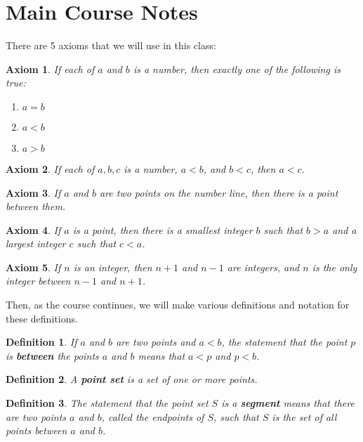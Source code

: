 \documentclass{article}
\newtheorem{axiom}{Axiom}
\newtheorem{definition}{Definition}
\begin{document}
\section*{Main Course Notes}
There are 5 axioms that we will use in this class:

\begin{axiom}
If each of $a$ and $b$ is a number, then exactly one of the following is true:
\begin{enumerate}
\item
$a = b$
\item
$a < b$
\item
$a > b$
\end{enumerate}
\end{axiom}

\begin{axiom}
If each of $a, b, c$ is a number, $a < b$, and $b < c$, then $a < c$.
\end{axiom}

\begin{axiom}
If $a$ and $b$ are two points on the number line, then there is a point between them.
\end{axiom}

\begin{axiom}
If $a$ is a point, then there is a smallest integer $b$ such that $b > a$ and a largest integer $c$ such that $c < a$.
\end{axiom}

\begin{axiom}
If $n$ is an integer, then $n + 1$ and $n - 1$ are integers, and $n$ is the only integer between $n - 1$ and $n + 1$.
\end{axiom}

Then, as the course continues, we will make various definitions and notation for these definitions.

\begin{definition}
If $a$ and $b$ are two points and $a < b$, the statement that the point $p$ is \textbf{between} the points $a$ and $b$ means that $a < p$ and $p < b$.
\end{definition}

\begin{definition}
A \textbf{point set} is a set of one or more points.
\end{definition}

\begin{definition}
The statement that the point set $S$ is a \textbf{segment} means that there are two points $a$ and $b$, called the \textit{endpoints} of $S$, such that $S$ is the set of all points between $a$ and $b$. 
\end{definition}
\end{document}
